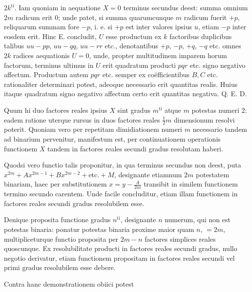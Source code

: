 $2k^{\mathrm{ti}}$. Iam quoniam in aequatione $X=0$ terminus secundus deest: summa
omnium $2m$ radicum erit 0; unde patet, si summa quarumcunque $m$ radicum
fuerit $+p$, reliquarum summam fore $-p$, i. e. si $+p$ est inter valores ipsius
$u$, etiam $-p$ inter eosdem erit. Hinc E. concludit, $U$ esse productum ex $k$
factoribus duplicibus talibus $uu-pp$, $uu-qq$, $uu-rr$ etc., denotantibus $+p$,
$-p$, $+q$, $-q$ etc. omnes $2k$ radices aequationis $U=0$, unde, propter multitudinem imparem horum factorum, terminus ultimus in $U$ erit quadratum producti $pqr$ etc. signo negativo affectum. Productum autem $pqr$ etc. semper ex
coëfficientibus $B,C$ etc. rationaliter determinari potest, adeoque necessario erit
quantitas realis. Huius itaque quadratum signo negativo affectum certo erit quantitas negativa. Q. E. D.

Quum hi duo factores reales ipsius $X$ sint gradus $m^{\mathrm{ti}}$ atque $m$ potestas
numeri 2: eadem ratione uterque rursus in duos factores reales $\frac12m$ dimensionum
resolvi poterit. Quoniam vero per repetitam dimidiationem numeri $m$ necessario
tandem ad binarium pervenitur, manifestum est, per continuationem operationis
functionem $X$ tandem in factores reales secundi gradus resolutam haberi.

Quodsi vero functio talis proponitur, in qua terminus secundus non deest,
puta $x^{2m}+Ax^{2m-1}+Bx^{2m-2}+\text{etc.}+M$, designante etiamnum $2m$ potestatem
binariam, haec per substitutionem $x=y-\frac{A}{2m}$ transibit in similem functionem
termino secundo carentem. Unde facile concluditur, etiam illam functionem in
factores reales secundi gradus resolubilem esse.

Denique proposita functione gradus $n^{\mathrm{ti}}$, designante $n$ numerum, qui non
est potestas binaria: ponatur potestas binaria proxime maior quam $n$, $=2m$,
multipliceturque functio proposita per $2m-n$ factores simplices reales quoscunque.
Ex resolubilitate producti in factores reales secundi gradus, nullo negotio
derivatur, etiam functionem propositam in factores reales secundi vel primi gradus
resolubilem esse debere.

Contra hanc demonstrationem obiici potest

